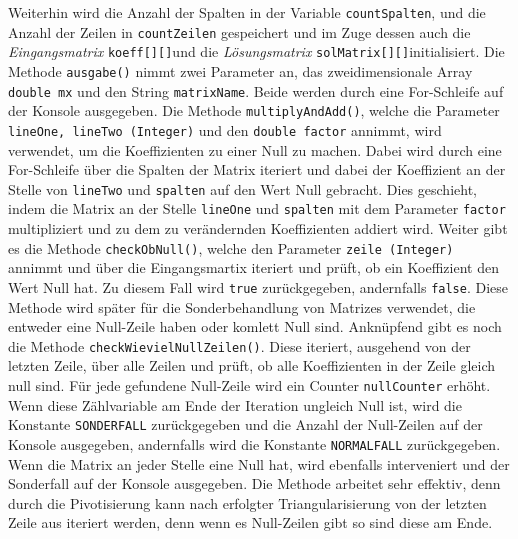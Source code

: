 \documentclass[a4paper, 12pt]{report}
\begin{document}
Weiterhin wird die Anzahl der Spalten in der Variable \texttt{countSpalten},
und die Anzahl der Zeilen in \texttt{countZeilen} gespeichert und
im Zuge dessen auch die \textit{Eingangsmatrix} \texttt{koeff[][]}und die \textit{Lösungsmatrix} \texttt{solMatrix[][]}initialisiert.
Die Methode \texttt{ausgabe()} nimmt zwei Parameter an, das zweidimensionale Array \texttt{double mx}
und den String \texttt{matrixName}. Beide werden durch eine For-Schleife auf der Konsole ausgegeben.
Die Methode \texttt{multiplyAndAdd()}, welche die Parameter \texttt{lineOne, lineTwo (Integer)}
und den \texttt{double factor} annimmt, wird verwendet, um die Koeffizienten zu einer Null zu machen.
Dabei wird durch eine For-Schleife über die Spalten der Matrix iteriert
und dabei der Koeffizient an der Stelle von \texttt{lineTwo} und \texttt{spalten} auf den Wert Null gebracht.
Dies geschieht, indem die Matrix an der Stelle \texttt{lineOne} und \texttt{spalten} mit dem Parameter \texttt{factor} multipliziert
und zu dem zu verändernden Koeffizienten addiert wird.
Weiter gibt es die Methode \texttt{checkObNull()}, welche den Parameter \texttt{zeile (Integer)} annimmt
und über die Eingangsmartix iteriert und prüft, ob ein Koeffizient den Wert Null hat. Zu diesem Fall wird
\texttt{true} zurückgegeben, andernfalls \texttt{false}.
Diese Methode wird später für die Sonderbehandlung von Matrizes verwendet, die entweder eine Null-Zeile haben oder komlett Null sind.
Anknüpfend gibt es noch die Methode \texttt{checkWievielNullZeilen()}. Diese iteriert, ausgehend von der letzten Zeile,
über alle Zeilen und prüft, ob alle Koeffizienten in der Zeile gleich null sind. Für jede gefundene Null-Zeile wird ein Counter
\texttt{nullCounter} erhöht. Wenn diese Zählvariable am Ende der Iteration ungleich Null ist, wird die Konstante \texttt{SONDERFALL} zurückgegeben
und die Anzahl der Null-Zeilen auf der Konsole ausgegeben, andernfalls wird die Konstante \texttt{NORMALFALL} zurückgegeben.
Wenn die Matrix an jeder Stelle eine Null hat, wird ebenfalls interveniert und der Sonderfall auf der Konsole ausgegeben.
Die Methode arbeitet sehr effektiv, denn durch die Pivotisierung kann nach erfolgter Triangularisierung von der letzten Zeile aus iteriert werden, denn
wenn es Null-Zeilen gibt so sind diese am Ende.
\end{document}
